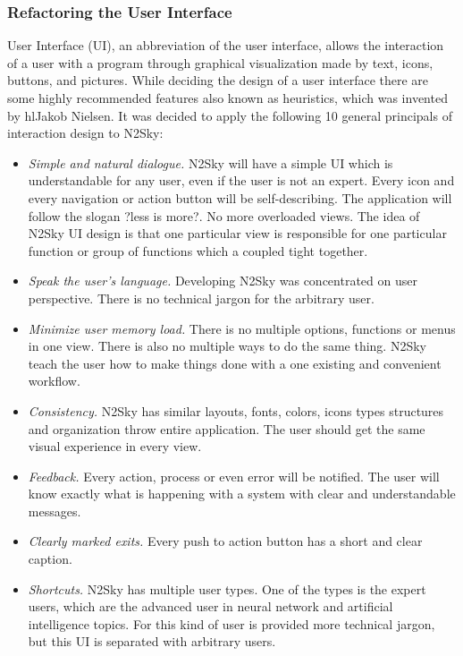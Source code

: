 \subsubsection{Refactoring the User Interface}\label{Refactoring the User Interface}

User Interface (UI), an abbreviation of the user interface, allows the interaction of a user with a program through graphical visualization made by text, icons, buttons, and pictures. While deciding the design of a user interface there are some highly recommended features also known as heuristics, which was invented by hl{Jakob Nielsen}. It was decided to apply the following 10 general principals of interaction design to N2Sky:

\begin{itemize}
\item \emph{Simple and natural dialogue.} N2Sky will have a simple UI which is understandable for any user, even if the user is not an expert. Every icon and every navigation or action button will be self-describing. The application will follow the slogan ?less is more?. No more overloaded views. The idea of N2Sky UI design is that one particular view is responsible for one particular function or group of functions which a coupled tight together.
\item \emph{Speak the user's language.} Developing N2Sky was concentrated on user perspective. There is no technical jargon for the arbitrary user.
\item \emph{Minimize user memory load.} There is no multiple options, functions or menus in one view. There is also no multiple ways to do the same thing. N2Sky teach the user how to make things done with a one existing and convenient workflow. 
\item \emph{Consistency.} N2Sky has similar layouts, fonts, colors, icons types structures and organization throw entire application. The user should get the same visual experience in every view.
\item \emph{Feedback.} Every action, process or even error will be notified. The user will know exactly what is happening with a system with clear and understandable messages.
\item \emph{Clearly marked exits.} Every push to action button has a short and clear caption.
\item \emph{Shortcuts.} N2Sky has multiple user types. One of the types is the expert users, which are the advanced user in neural network and artificial intelligence topics. For this kind of user is provided more technical jargon, but this UI is separated with arbitrary users.  

\end{itemize}

